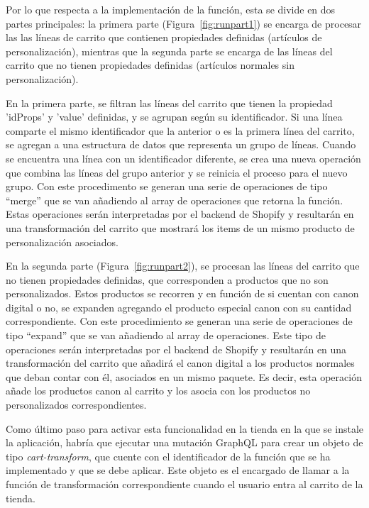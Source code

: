 \documentclass[12pt]{article}
\begin{document}
Por lo que respecta a la implementación de la función, esta se divide en dos partes principales: la primera parte (Figura~\ref{fig:runpart1})  se encarga de procesar las las líneas de carrito que contienen
propiedades definidas (artículos de personalización), mientras que la segunda parte se encarga de las líneas del carrito que no tienen propiedades definidas (artículos normales sin personalización).

En la primera parte, se filtran las líneas del carrito que tienen la propiedad 'idProps' y 'value' definidas, y se agrupan según su identificador. Si una línea comparte el mismo identificador que la anterior
o es la primera línea del carrito, se agregan a una estructura de datos que representa un grupo de líneas. Cuando se encuentra una línea con un identificador diferente, se crea una nueva operación 
que combina las líneas del grupo anterior y se reinicia el proceso para el nuevo grupo. Con este procedimento se generan una serie de operaciones de tipo ``merge'' que se van añadiendo al array de operaciones que retorna 
la función. Estas operaciones serán interpretadas por el backend de Shopify y resultarán en una transformación del carrito que mostrará los items de un mismo producto de personalización asociados.

En la segunda parte (Figura~\ref{fig:runpart2}), se procesan las líneas del carrito que no tienen propiedades definidas, que corresponden a productos que no son personalizados. Estos productos se recorren y en función de si cuentan con canon digital o no, se expanden agregando 
el producto especial canon con su cantidad correspondiente. Con este procedimiento se generan una serie de operaciones de tipo ``expand'' que se van añadiendo al array de operaciones. Este tipo de operaciones
serán interpretadas por el backend de Shopify y resultarán en una transformación del carrito que añadirá el canon digital a los productos normales que deban contar con él, asociados en un mismo paquete. Es decir, esta operación añade los productos canon al carrito
y los asocia con los productos no personalizados correspondientes.

Como último paso para activar esta funcionalidad en la tienda en la que se instale la aplicación, habría que ejecutar una mutación GraphQL para crear un objeto de tipo \textit{cart-transform}, que cuente con el identificador de la función que se ha implementado
y que se debe aplicar. Este objeto es el encargado de llamar a la función de transformación correspondiente cuando el usuario entra al carrito de la tienda.
\end{document}
